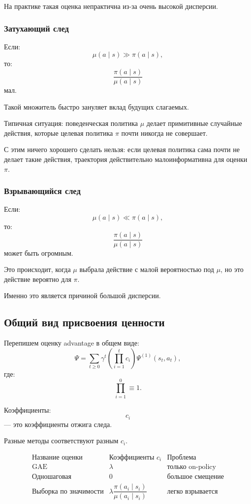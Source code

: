 \documentclass[12pt,a4paper]{article}
\begin{document}
На практике такая оценка непрактична из-за очень высокой дисперсии.

\subsubsection{Затухающий след}

Если:
\[
\mu(a\mid s)\gg \pi(a\mid s),
\]
то:
\[
\frac{\pi(a\mid s)}{\mu(a\mid s)}
\]
мал.

Такой множитель быстро зануляет вклад будущих слагаемых.

Типичная ситуация: поведенческая политика $\mu$ делает примитивные случайные действия, которые целевая политика $\pi$ почти никогда не совершает.

С этим ничего хорошего сделать нельзя: если целевая политика сама почти не делает такие действия, траектория действительно малоинформативна для оценки $\pi$.

\subsubsection{Взрывающийся след}

Если:
\[
\mu(a\mid s)\ll \pi(a\mid s),
\]
то:
\[
\frac{\pi(a\mid s)}{\mu(a\mid s)}
\]
может быть огромным.

Это происходит, когда $\mu$ выбрала действие с малой вероятностью под $\mu$, но это действие вероятно для $\pi$.

Именно это является причиной большой дисперсии.

\subsection{Общий вид присвоения ценности}

Перепишем оценку advantage в общем виде:
\[
\Psi
=
\sum_{t\ge 0}
\gamma^t
\left(
\prod_{i=1}^{t}
c_i
\right)
\Psi^{(1)}(s_t,a_t),
\]
где:
\[
\prod_{i=1}^{0}
\equiv
1.
\]

Коэффициенты:
\[
c_i
\]
--- это коэффициенты отжига следа.

Разные методы соответствуют разным $c_i$.

\[
\begin{array}{c|c|c}
\text{Название оценки} & \text{Коэффициенты }c_i & \text{Проблема} \\
\hline
\text{GAE} & \lambda & \text{только on-policy} \\
\text{Одношаговая} & 0 & \text{большое смещение} \\
\text{Выборка по значимости} &
\lambda
\dfrac{\pi(a_i\mid s_i)}{\mu(a_i\mid s_i)}
&
\text{легко взрывается}
\end{array}
\]
\end{document}
